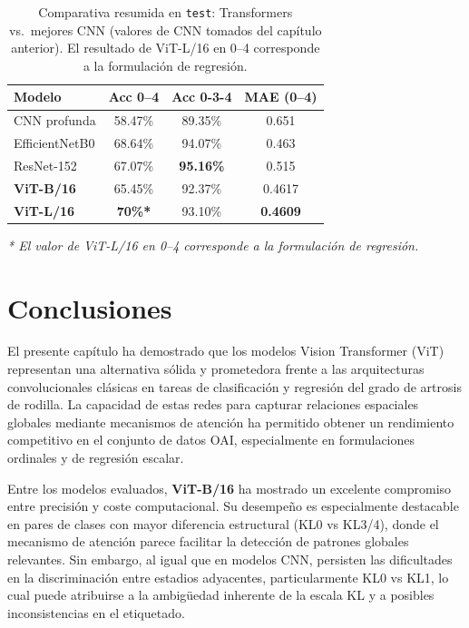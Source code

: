 \documentclass[11pt,spanish,listoffigures,listoftables]{tfgetsinf}
\begin{document}
\begin{table}[H]
	\centering
	\caption{Comparativa resumida en \texttt{test}: Transformers vs.\ mejores CNN (valores de CNN tomados del capítulo anterior). El resultado de ViT-L/16 en 0--4 corresponde a la formulación de regresión.}
	\label{tab:vit_vs_cnns}
	\begin{tabular}{lccc}
		\toprule
		\textbf{Modelo}   & \textbf{Acc 0--4} & \textbf{Acc 0-3-4} & \textbf{MAE (0--4)} \\
		\midrule
		CNN profunda      & 58.47\%           & 89.35\%            & 0.651               \\
		EfficientNetB0    & 68.64\%           & 94.07\%            & 0.463               \\
		ResNet-152        & 67.07\%           & \textbf{95.16\%}   & 0.515               \\
		\textbf{ViT-B/16} & 65.45\%           & 92.37\%            & 0.4617              \\
		\textbf{ViT-L/16} & \textbf{70\%*}    & 93.10\%            & \textbf{0.4609}     \\
		\bottomrule
	\end{tabular}
	\begin{flushleft}
		\footnotesize\textit{* El valor de ViT-L/16 en 0--4 corresponde a la formulación de regresión.}
	\end{flushleft}
\end{table}

\section{Conclusiones}
El presente capítulo ha demostrado que los modelos Vision Transformer (ViT) representan una alternativa sólida y prometedora frente a las arquitecturas convolucionales clásicas en tareas de clasificación y regresión del grado de artrosis de rodilla. La capacidad de estas redes para capturar relaciones espaciales globales mediante mecanismos de atención ha permitido obtener un rendimiento competitivo en el conjunto de datos OAI, especialmente en formulaciones ordinales y de regresión escalar.

Entre los modelos evaluados, \textbf{ViT-B/16} ha mostrado un excelente compromiso entre precisión y coste computacional. Su desempeño es especialmente destacable en pares de clases con mayor diferencia estructural (KL0 vs KL3/4), donde el mecanismo de atención parece facilitar la detección de patrones globales relevantes. Sin embargo, al igual que en modelos CNN, persisten las dificultades en la discriminación entre estadios adyacentes, particularmente KL0 vs KL1, lo cual puede atribuirse a la ambigüedad inherente de la escala KL y a posibles inconsistencias en el etiquetado.
\end{document}
